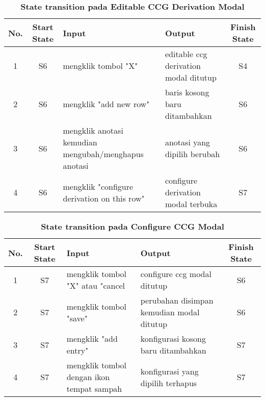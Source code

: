 \begin{table}
  \caption{\textbf{State transition pada Editable CCG Derivation Modal}}
  \label{table:ccg-modal}
  \centering
  \begin{tabular}{| c | c | m{45mm} | m{45mm} | c |}
    \hline
    \textbf{No.} & \textbf{Start State} & \textbf{Input} & \textbf{Output} & \textbf{Finish State} \\ [0.5ex]
    \hline
    1 & S6 & mengklik tombol "X" & editable ccg derivation modal ditutup & S4 \\
    2 & S6 & mengklik "add new row" & baris kosong baru ditambahkan & S6 \\
    3 & S6 & mengklik anotasi kemudian mengubah/menghapus anotasi & anotasi yang dipilih berubah & S6 \\
    4 & S6 & mengklik "configure derivation on this row" & configure derivation modal terbuka & S7 \\ [1ex]
    \hline
  \end{tabular}
\end{table}

\begin{table}
  \caption{\textbf{State transition pada Configure CCG Modal}}
  \label{table:conf-modal}
  \centering
  \begin{tabular}{| c | c | m{45mm} | m{45mm} | c |}
    \hline
    \textbf{No.} & \textbf{Start State} & \textbf{Input} & \textbf{Output} & \textbf{Finish State} \\ [0.5ex]
    \hline
    1 & S7 & mengklik tombol "X" atau "cancel & configure ccg modal ditutup & S6 \\
    2 & S7 & mengklik tombol "save" & perubahan disimpan kemudian modal ditutup & S6 \\
    3 & S7 & mengklik "add entry" & konfigurasi kosong baru ditambahkan & S7 \\
    4 & S7 & mengklik tombol dengan ikon tempat sampah & konfigurasi yang dipilih terhapus & S7 \\ [1ex]
    \hline
  \end{tabular}
\end{table}
